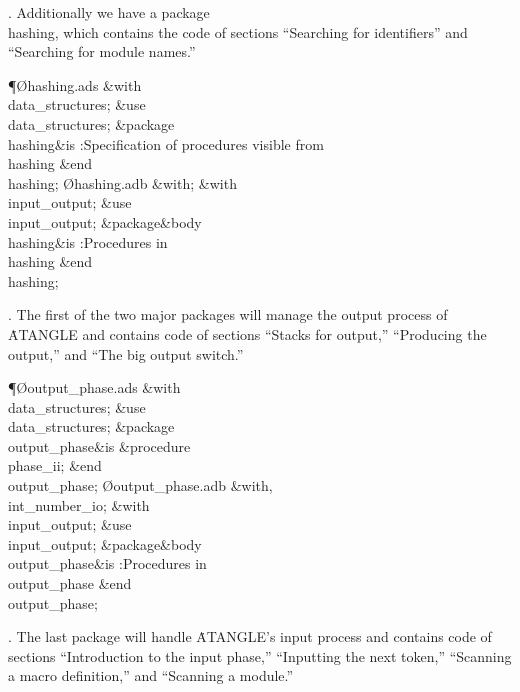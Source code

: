 \*. Additionally we have a package \\{hashing}, which contains the code of
sections ``Searching for identifiers''
and ``Searching for module names.''

\Y\P\O{hashing.ads}\?\6
\?\&{with}\8\\{data\_structures};\6
\&{use}\8\\{data\_structures};\6
\&{package}\8\1\\{hashing}\2\8\&{is}\8\1\6
:Specification of procedures visible from \\{hashing}\X\2\6
\&{end}\8\\{hashing};\7
\O{hashing.adb}\?\6
\?\&{with}\8;\6
\&{with}\8\\{input\_output};\6
\&{use}\8\\{input\_output};\6
\&{package}\8\1\&{body}\8\\{hashing}\2\8\&{is}\8\1\6
:Procedures in \\{hashing}\X\2\6
\&{end}\8\\{hashing};\par
\fi

\*. The first of the two major packages will manage the output process of
\.{ATANGLE} and contains code of sections ``Stacks for output,''
``Producing the output,'' and ``The big output switch.''

\Y\P\O{output\_phase.ads}\?\6
\?\&{with}\8\\{data\_structures};\6
\&{use}\8\\{data\_structures};\6
\&{package}\8\1\\{output\_phase}\2\8\&{is}\8\1\6
\&{procedure}\8\1\\{phase\_ii}\2;\2\6
\&{end}\8\\{output\_phase};\7
\O{output\_phase.adb}\?\6
\?\&{with}\8\?,\?\\{int\_number\_io};\6
\&{with}\8\\{input\_output};\6
\&{use}\8\\{input\_output};\6
\&{package}\8\1\&{body}\8\\{output\_phase}\2\8\&{is}\8\1\6
:Procedures in \\{output\_phase}\X\2\6
\&{end}\8\\{output\_phase};\par
\fi

\*. The last package will handle \.{ATANGLE}'s input process and contains
code
of sections ``Introduction to the input phase,'' ``Inputting the next
token,'' ``Scanning a macro definition,'' and ``Scanning a module.''

